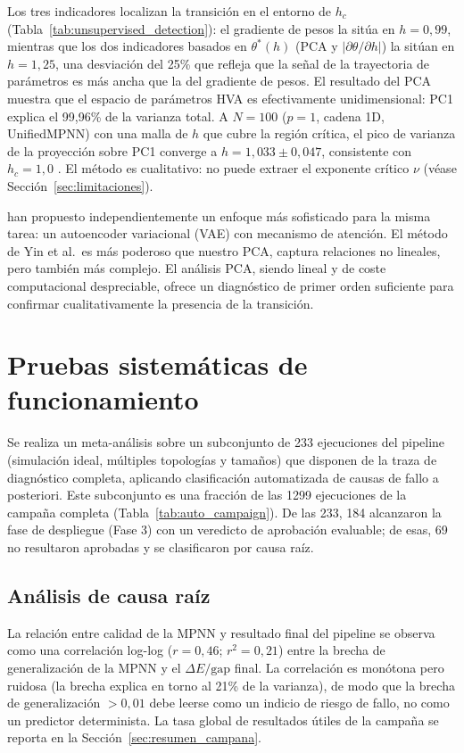 \documentclass[11pt,a4paper,spanish]{book}
\begin{document}
Los tres indicadores localizan la transición en el entorno de $h_c$ (Tabla~\ref{tab:unsupervised_detection}): el gradiente de pesos la sitúa en $h = 0,99$, mientras que los dos indicadores basados en $\theta^*(h)$ (PCA y $|\partial\theta/\partial h|$) la sitúan en $h = 1,25$, una desviación del 25\% que refleja que la señal de la trayectoria de parámetros es más ancha que la del gradiente de pesos. El resultado del PCA muestra que el espacio de parámetros HVA es efectivamente unidimensional: PC1 explica el 99,96\% de la varianza total. A $N = 100$ ($p = 1$, cadena 1D, UnifiedMPNN) con una malla de $h$ que cubre la región crítica, el pico de varianza de la proyección sobre PC1 converge a $h = 1,033 \pm 0,047$, consistente con $h_c = 1,0$ \citep{dutta2015}. El método es cualitativo: no puede extraer el exponente crítico $\nu$ (véase Sección~\ref{sec:limitaciones}).

\citet{yin2025} han propuesto independientemente un enfoque más sofisticado para la misma tarea: un autoencoder variacional (VAE) con mecanismo de atención. El método de Yin et al.\ es más poderoso que nuestro PCA, captura relaciones no lineales, pero también más complejo. El análisis PCA, siendo lineal y de coste computacional despreciable, ofrece un diagnóstico de primer orden suficiente para confirmar cualitativamente la presencia de la transición.

\section{Pruebas sistemáticas de funcionamiento}

Se realiza un meta-análisis sobre un subconjunto de 233 ejecuciones del pipeline (simulación ideal, múltiples topologías y tamaños) que disponen de la traza de diagnóstico completa, aplicando clasificación automatizada de causas de fallo a posteriori. Este subconjunto es una fracción de las 1299 ejecuciones de la campaña completa (Tabla~\ref{tab:auto_campaign}). De las 233, 184 alcanzaron la fase de despliegue (Fase 3) con un veredicto de aprobación evaluable; de esas, 69 no resultaron aprobadas y se clasificaron por causa raíz.

\subsection{Análisis de causa raíz}

La relación entre calidad de la MPNN y resultado final del pipeline se observa como una correlación log-log ($r = 0,46$; $r^2 = 0,21$) entre la brecha de generalización de la MPNN y el $\Delta E/\text{gap}$ final. La correlación es monótona pero ruidosa (la brecha explica en torno al 21\% de la varianza), de modo que la brecha de generalización $> 0,01$ debe leerse como un indicio de riesgo de fallo, no como un predictor determinista. La tasa global de resultados útiles de la campaña se reporta en la Sección~\ref{sec:resumen_campana}.
\end{document}
